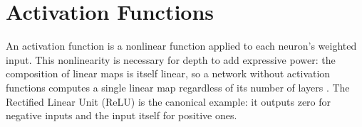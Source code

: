 

\section{Activation Functions}
\label{subsec:activation-functions} 



An activation function is a nonlinear function applied to each neuron's weighted input. 
This nonlinearity is necessary for depth to add expressive power: the composition of linear maps is itself linear, 
so a network without activation functions computes a single linear map regardless of its number of layers \parencite{dubey_activation_2022}.
The Rectified Linear Unit (ReLU) \parencite{nair_rectified_2010} is the canonical example: it outputs zero for negative inputs and the input itself for positive ones.


